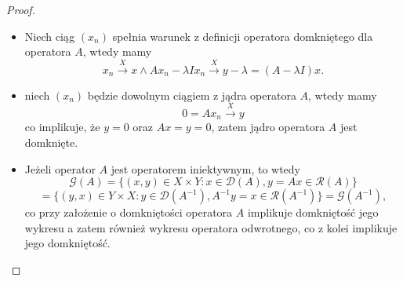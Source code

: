 \documentclass[12pt]{article}
\begin{document}
\begin{proof}
	\begin{itemize}
		\item Niech ciąg $(x_n)$ spełnia warunek z definicji operatora domkniętego dla operatora $A$, wtedy mamy 
		\begin{displaymath}
			x_n \stackrel{X	}{\to} x \land Ax_n -\lambda Ix_n \stackrel{X}{\to}y-\lambda  = (A-\lambda I)x.
		\end{displaymath}
		\item niech $(x_n)$ będzie dowolnym ciągiem z jądra operatora $A$, wtedy mamy
		\begin{displaymath}
		0 = Ax_n \stackrel{X}{\to} y
		\end{displaymath}
		co implikuje, że $y = 0$ oraz $Ax = y =0$, zatem jądro operatora $A$ jest domknięte.
		\item Jeżeli operator $A$ jest operatorem iniektywnym, to wtedy 
		\begin{displaymath}
		\mathcal{G}(A) = \{(x,y)\in X\times Y\colon x\in \mathcal{D}(A), y = Ax\in \mathcal{R}(A)\} 
		\end{displaymath}
		\begin{displaymath}
			=\{(y,x)\in Y\times X\colon y\in \mathcal{D}(A^{-1}), A^{-1}y = x\in \mathcal{R}(A^{-1})\} =  \mathcal{G}(A^{-1}),
		\end{displaymath}
		co przy założenie o domkniętości operatora $A$ implikuje domkniętość jego wykresu a zatem również wykresu operatora odwrotnego, co z kolei implikuje jego domkniętość.
	\end{itemize}
\end{proof}
\end{document}
